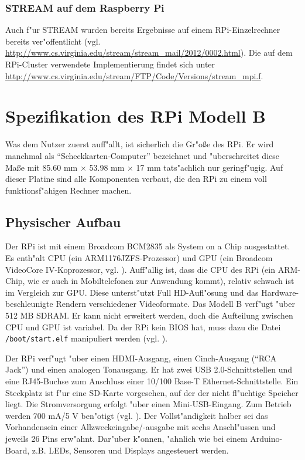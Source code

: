 \subsubsection{STREAM auf dem Raspberry Pi}\label{STREAM-RPi}

Auch f"ur STREAM wurden bereits Ergebnisse auf einem RPi-Einzelrechner bereits ver"offentlicht (vgl. \url{http://www.cs.virginia.edu/stream/stream_mail/2012/0002.html}). Die auf dem RPi-Cluster verwendete Implementierung findet sich unter \url{http://www.cs.virginia.edu/stream/FTP/Code/Versions/stream_mpi.f}.  

\section{Spezifikation des RPi Modell B}\label{RPi-Spezi}

Was dem Nutzer zuerst auff"allt, ist sicherlich die Gr"o\ss e des RPi. Er wird manchmal als "`Scheckkarten-Computer"' bezeichnet und "uberschreitet diese Ma\ss e mit 85.60 mm $\times$ 53.98 mm $\times$ 17 mm tats"achlich nur geringf"ugig. Auf dieser Platine sind alle Komponenten verbaut, die den RPi zu einem voll funktionsf"ahigen Rechner machen.

\subsection{Physischer Aufbau}\label{RPi-Hardware}

Der RPi ist mit einem Broadcom BCM2835 als System on a Chip ausgestattet. Es enth"alt CPU (ein ARM1176JZFS-Prozessor) und GPU (ein Broadcom VideoCore IV-Koprozessor, vgl. \cite{scrguide02}). Auff"allig ist, dass die CPU des RPi (ein ARM-Chip, wie er auch in Mobiltelefonen zur Anwendung kommt), relativ schwach ist im Vergleich zur GPU. Diese unterst"utzt Full HD-Aufl"osung und das Hardware-beschleunigte Rendern verschiedener Videoformate. Das Modell B verf"ugt "uber 512 MB SDRAM. Er kann nicht erweitert werden, doch die Aufteilung zwischen CPU und GPU ist variabel. Da der RPi kein BIOS hat, muss dazu die Datei \texttt{/boot/start.elf} manipuliert werden (vgl. \cite{pow12}).

Der RPi verf"ugt "uber einen HDMI-Ausgang, einen Cinch-Ausgang ("`RCA Jack"') und einen analogen Tonausgang. Er hat zwei USB 2.0-Schnittstellen und eine RJ45-Buchse zum Anschluss einer 10/100 Base-T Ethernet-Schnittstelle. Ein Steckplatz ist f"ur eine SD-Karte vorgesehen, auf der der nicht fl"uchtige Speicher liegt. Die Stromversorgung erfolgt "uber einen Mini-USB-Eingang. Zum Betrieb werden 700 mA/5 V ben"otigt (vgl. \cite{pow12}). Der Vollst"andigkeit halber sei das Vorhandensein einer Allzweckeingabe/-ausgabe mit sechs Anschl"ussen und jeweils 26 Pins erw"ahnt. Dar"uber k"onnen, "ahnlich wie bei einem Arduino-Board, z.B. LEDs, Sensoren und Displays angesteuert werden. 

